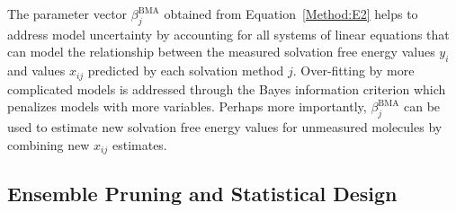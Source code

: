\documentclass[journal=jpcbfk, manuscript=article]{achemso}
\newcommand{\+}[1]{\ensuremath{\mathbf{#1}}}
\begin{document}
The parameter vector $\beta_j^{\text{BMA}}$ obtained from Equation~\ref{Method:E2} helps to address model uncertainty by accounting for all systems of linear equations that can model the relationship between the measured solvation free energy values $y_i$ and values $x_{ij}$ predicted by each solvation method $j$.
Over-fitting by more complicated models is addressed through the Bayes information criterion which penalizes models with more variables.
Perhaps more importantly, $\beta_j^{\text{BMA}}$ can be used to estimate new solvation free energy values for unmeasured molecules by combining new $x_{i j}$ estimates.

\subsection{Ensemble Pruning and Statistical Design} \label{Method:StatEnsemble}

\end{document}
